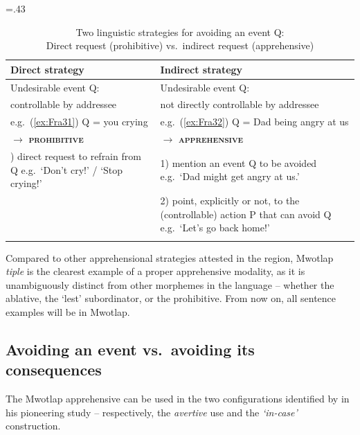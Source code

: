\documentclass[output=paper,colorlinks,citecolor=brown]{langscibook}
\begin{document}
\begin{table}
\caption{Two linguistic strategies for avoiding an event Q:\\Direct request (prohibitive) vs.\ indirect request (apprehensive)}
\label{tab:avoidingstrategies}
\tabcolsep=.43\tabcolsep%
\begin{tabularx}{\textwidth}{QQ}
\lsptoprule
{\textbf{Direct strategy}} & {\textbf{Indirect strategy}} \\
\midrule
Undesirable event Q: & Undesirable event Q: \\
controllable by addressee & not directly controllable by addressee \\
e.g.\ (\ref{ex:Fra31}) Q = you crying & e.g.\ (\ref{ex:Fra32}) Q = Dad being angry at us \\
\tablevspace
$\rightarrow$ \textbf{\textsc{prohibitive}} & $\rightarrow$ \textbf{\textsc{apprehensive}} \\
) direct request to refrain from Q\newline
e.g.\ `Don’t cry!' / `Stop crying!' & 1) mention an event Q to be avoided \newline
                                        e.g.\ `Dad might get angry at us.' \\
 & 2) point, explicitly or not, to the (controllable) action P that can avoid Q \newline
    e.g.\ `Let's go back home!' \\
 \lspbottomrule
\end{tabularx}
\end{table}




 
Compared to other apprehensional strategies attested in the region, Mwotlap \textit{tiple} is the clearest example of a proper apprehensive modality, as it is unambiguously distinct from other morphemes in the language -- whether the ablative, the `lest' subordinator, or the prohibitive. From now on, all sentence examples will be in Mwotlap.


\subsection{Avoiding an event vs.\ avoiding its consequences}
\label{subsec:avoiding}
 
The Mwotlap apprehensive can be used in the two configurations identified by \citet[299]{lichtenberk1995} in his pioneering study -- respectively, the \textit{avertive} use and the \textit{`in-case'} construction.
\end{document}
